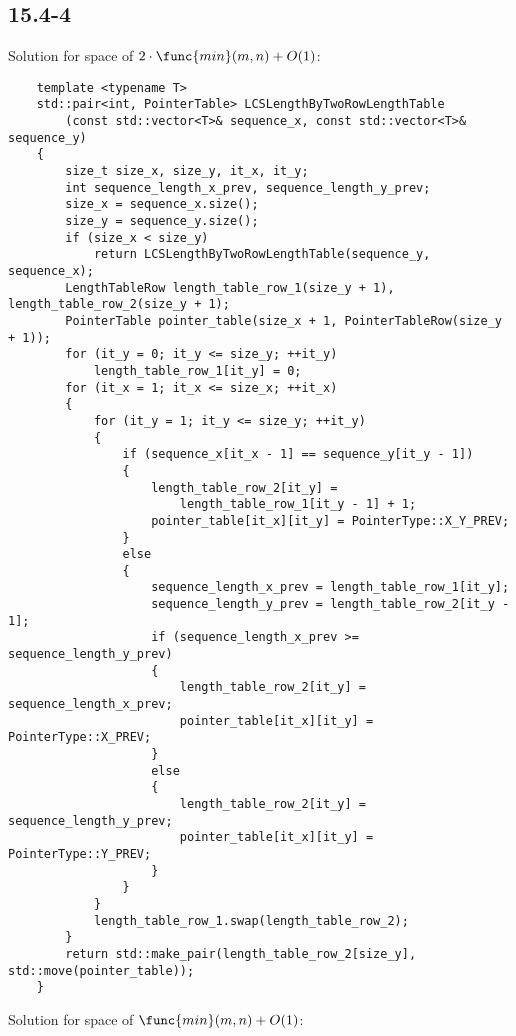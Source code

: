 \subsection*{15.4-4}

Solution for space of $2 \cdot \func{min}(m,n) + O(1)$:

\begin{verbatim}
    template <typename T>
    std::pair<int, PointerTable> LCSLengthByTwoRowLengthTable
        (const std::vector<T>& sequence_x, const std::vector<T>& sequence_y) 
    {
        size_t size_x, size_y, it_x, it_y;
        int sequence_length_x_prev, sequence_length_y_prev;
        size_x = sequence_x.size();
        size_y = sequence_y.size();
        if (size_x < size_y)
            return LCSLengthByTwoRowLengthTable(sequence_y, sequence_x);
        LengthTableRow length_table_row_1(size_y + 1), length_table_row_2(size_y + 1);
        PointerTable pointer_table(size_x + 1, PointerTableRow(size_y + 1));
        for (it_y = 0; it_y <= size_y; ++it_y)
            length_table_row_1[it_y] = 0;
        for (it_x = 1; it_x <= size_x; ++it_x) 
        {
            for (it_y = 1; it_y <= size_y; ++it_y) 
            {
                if (sequence_x[it_x - 1] == sequence_y[it_y - 1]) 
                {
                    length_table_row_2[it_y] = 
                        length_table_row_1[it_y - 1] + 1;
                    pointer_table[it_x][it_y] = PointerType::X_Y_PREV;
                } 
                else 
                {
                    sequence_length_x_prev = length_table_row_1[it_y];
                    sequence_length_y_prev = length_table_row_2[it_y - 1];
                    if (sequence_length_x_prev >= sequence_length_y_prev) 
                    {
                        length_table_row_2[it_y] = sequence_length_x_prev;
                        pointer_table[it_x][it_y] = PointerType::X_PREV;
                    } 
                    else 
                    {
                        length_table_row_2[it_y] = sequence_length_y_prev;
                        pointer_table[it_x][it_y] = PointerType::Y_PREV;
                    }
                }
            }
            length_table_row_1.swap(length_table_row_2);
        }
        return std::make_pair(length_table_row_2[size_y], std::move(pointer_table));
    }
\end{verbatim}

Solution for space of $\func{min}(m,n) + O(1)$:

